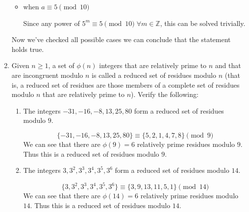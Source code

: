 \documentclass[12pt]{exam}
\theoremstyle{definition}
\begin{document}
\begin{enumerate}
\begin{answer}
\begin{itemize}
                        \item when $a \equiv 5 \pmod{10}$
                        
                        Since any power of $5^m \equiv 5 \pmod{10} \; \forall m \in \mathbb{Z}$, this can be solved trivially.
                  \end{itemize}

                  Now we've checked all possible cases we can conclude that the statement holds true.
            \end{answer}

            \setcounter{enumi}{11}
      \item Given $n \geq 1$, a set of $\phi(n)$ integers that are relatively prime to $n$
            and that are incongruent modulo $n$ is called a reduced set of residues modulo $n$
            (that is, a reduced set of residues are those members of a complete set of residues
            modulo $n$ that are relatively prime to $n$). Verify the following:
            \begin{enumerate}
                  \item The integers $-31, -16, -8, 13, 25, 80$ form a reduced set of residues modulo $9$.

                        \begin{answer}
                              \[
                                    \{-31, -16, -8, 13, 25, 80\} \equiv \{5, 2, 1, 4, 7, 8\} \pmod{9}
                              \]
                              We can see that there are $\phi(9) = 6$ relatively prime residues modulo $9$. 
                              Thus this is a reduced set of residues modulo $9$.
                        \end{answer}

                  \item The integers $3, 3^2, 3^3, 3^4, 3^5, 3^6$ form a reduced set of residues modulo $14$.

                        \begin{answer}
                              \[
                                    \{3, 3^2, 3^3, 3^4, 3^5, 3^6\} \equiv \{3, 9, 13, 11, 5, 1\} \pmod{14}
                              \]
                              We can see that there are $\phi(14) = 6$ relatively prime residues modulo $14$. 
                              Thus this is a reduced set of residues modulo $14$.
                        \end{answer}


\end{enumerate}
\end{enumerate}
\end{document}

